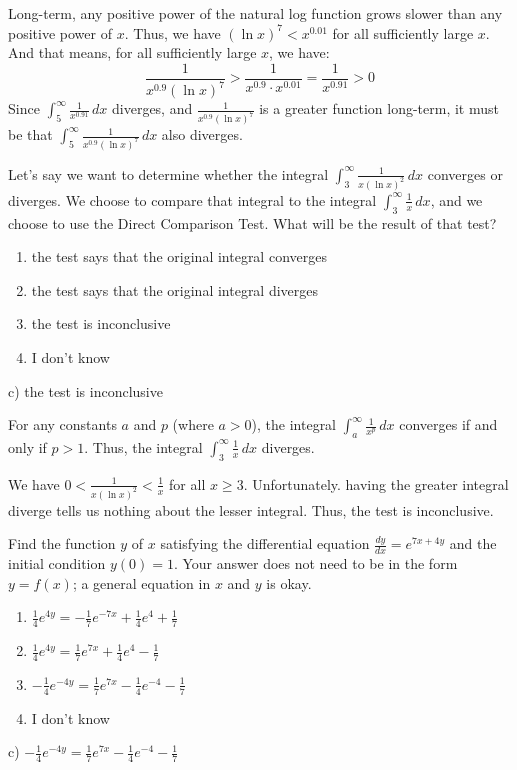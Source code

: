 \documentclass[addpoints,12pt,answers]{exam}
\begin{document}
\begin{questions}
\begin{solution}
    Long-term, any positive power of the natural log function grows slower than any positive power of $x$. Thus, we have $(\ln x)^7<x^{0.01}$ for all sufficiently large $x$. And that means, for all sufficiently large $x$, we have:
    $$\frac{1}{x^{0.9}(\ln x)^7}>\frac{1}{x^{0.9}\cdot x^{0.01}}=\frac{1}{x^{0.91}}>0$$
    Since $\displaystyle\int_5^\infty\frac{1}{x^{0.91}}\,dx$ diverges, and $\displaystyle\frac{1}{x^{0.9}(\ln x)^7}$ is a greater function long-term, it must be that $\displaystyle\int_5^\infty\frac{1}{x^{0.9}(\ln x)^7}\,dx$ also diverges.
  \end{solution}
  \newpage
  \question
  Let's say we want to determine whether the integral $\displaystyle\int_3^\infty\frac{1}{x(\ln x)^2}\,dx$ converges or diverges. We choose to compare that integral to the integral $\displaystyle\int_3^\infty\frac{1}{x}\,dx$, and we choose to use the Direct Comparison Test. What will be the result of that test?
  \begin{enumerate}[label=\alph*)]
    \item
    the test says that the original integral converges
    \item
    the test says that the original integral diverges
    \item
    the test is inconclusive
    \item
    I don't know
  \end{enumerate}
  \begin{solution}
    c) the test is inconclusive
    
    For any constants $a$ and $p$ (where $a>0$), the integral $\displaystyle\int_a^{\infty}\frac{1}{x^p}\,dx$ converges if and only if $p>1$. Thus, the integral $\displaystyle\int_3^\infty\frac{1}{x}\,dx$ diverges.
    
    We have $\displaystyle 0<\frac{1}{x(\ln x)^2}<\frac{1}{x}$ for all $x\ge 3$. Unfortunately. having the greater integral diverge tells us nothing about the lesser integral. Thus, the test is inconclusive.
  \end{solution}
  \newpage
{}
  \question
  Find the function $y$ of $x$ satisfying the differential equation $\displaystyle\frac{dy}{dx}=e^{7x+4y}$ and the initial condition $y(0)=1$. Your answer does not need to be in the form $y=f(x)$; a general equation in $x$ and $y$ is okay.
  \begin{enumerate}[label=\alph*)]
    \item
    $\displaystyle \frac{1}{4}e^{4y}=-\frac{1}{7}e^{-7x}+\frac{1}{4}e^4+\frac{1}{7}$
    \item
    $\displaystyle \frac{1}{4}e^{4y}=\frac{1}{7}e^{7x}+\frac{1}{4}e^4-\frac{1}{7}$
    \item
    $\displaystyle -\frac{1}{4}e^{-4y}=\frac{1}{7}e^{7x}-\frac{1}{4}e^{-4}-\frac{1}{7}$
    \item
    I don't know
  \end{enumerate}
  \begin{solution}
    c) $\displaystyle -\frac{1}{4}e^{-4y}=\frac{1}{7}e^{7x}-\frac{1}{4}e^{-4}-\frac{1}{7}$
        

\end{solution}
\end{questions}
\end{document}
